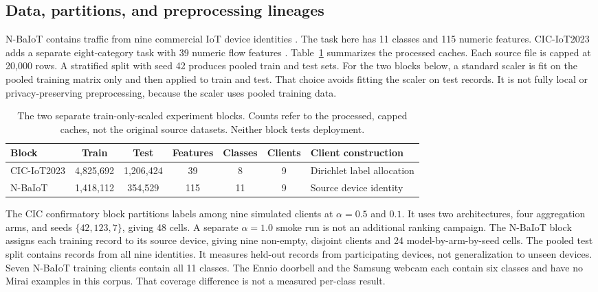 \documentclass{ieeeaccess}
\begin{document}
\subsection{Data, partitions, and preprocessing lineages}
N-BaIoT contains traffic from nine commercial IoT device identities \cite{meidan18}. The task here has 11 classes and 115 numeric features. CIC-IoT2023 adds a separate eight-category task with 39 numeric flow features \cite{neto23}. Table~\ref{tab:data} summarizes the processed caches. Each source file is capped at 20,000 rows. A stratified split with seed 42 produces pooled train and test sets. For the two blocks below, a standard scaler is fit on the pooled training matrix only and then applied to train and test. That choice avoids fitting the scaler on test records. It is not fully local or privacy-preserving preprocessing, because the scaler uses pooled training data.

\begin{table}[!t]
\centering
\caption{The two separate train-only-scaled experiment blocks. Counts refer to the processed, capped caches, not the original source datasets. Neither block tests deployment.}
\label{tab:data}
\small
\begin{tabular}{lcccccl}
\hline
Block & Train & Test & Features & Classes & Clients & Client construction \\
\hline
CIC-IoT2023 & 4,825,692 & 1,206,424 & 39 & 8 & 9 & Dirichlet label allocation \\
N-BaIoT & 1,418,112 & 354,529 & 115 & 11 & 9 & Source device identity \\
\hline
\end{tabular}
\end{table}

The CIC confirmatory block partitions labels among nine simulated clients at $\alpha=0.5$ and $0.1$. It uses two architectures, four aggregation arms, and seeds $\{42,123,7\}$, giving 48 cells. A separate $\alpha=1.0$ smoke run is not an additional ranking campaign. The N-BaIoT block assigns each training record to its source device, giving nine non-empty, disjoint clients and 24 model-by-arm-by-seed cells. The pooled test split contains records from all nine identities. It measures held-out records from participating devices, not generalization to unseen devices. Seven N-BaIoT training clients contain all 11 classes. The Ennio doorbell and the Samsung webcam each contain six classes and have no Mirai examples in this corpus. That coverage difference is not a measured per-class result.
\end{document}

